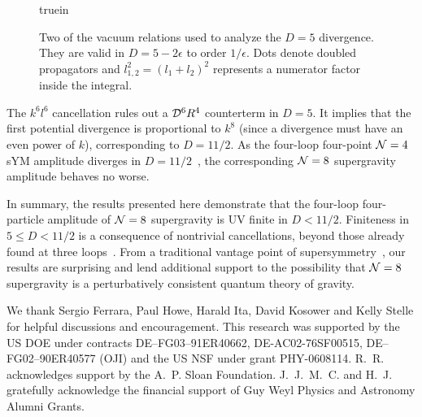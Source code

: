 \documentclass[aps,prl,twocolumn,groupedaddress,draft,showpacs,nofootinbib]{revtex4}
\def\eps{\epsilon}
\def\NeqFour{{{\cal N}=4}}
\def\NeqEight{{{\cal N}=8}}
\begin{document}
\begin{figure}[t]
\centerline{ truein }
\caption[a]{\small Two of the vacuum relations used to analyze
the $D=5$ divergence.  They are valid in $D=5-2\eps$ to order $1/\eps$.
Dots denote doubled propagators and $l^2_{1,2}=(l_1+l_2)^2$ 
represents a numerator factor inside the integral.}
\label{VacuumRelationsFigure}
\end{figure}

The $k^6 l^6$ cancellation rules out a ${\cal D}^6R^4$ counterterm
in $D=5$.  It implies that the first potential divergence
is proportional to $k^8$ (since a divergence must have an
even power of $k$), corresponding to $D=11/2$.  As the four-loop
four-point $\NeqFour$ sYM amplitude diverges in
$D=11/2$~\cite{FourLoopPlanarYM,FourLoopYM}, the corresponding
$\NeqEight$ supergravity amplitude behaves no worse.

In summary, the results presented here demonstrate that the four-loop
four-particle amplitude of $\NeqEight$ supergravity is UV finite
in $D < 11/2$.  Finiteness in $5\le D<11/2$ is a consequence of
nontrivial cancellations, beyond those already found at three
loops~\cite{GravityThree,CompactThree}. 
From a traditional vantage point of
supersymmetry~\cite{Supergravity,HoweStelleNew,HoweStelleRecent}, our
results are surprising and lend additional support to the possibility
that $\NeqEight$ supergravity is a perturbatively consistent quantum
theory of gravity. 

We thank Sergio Ferrara, Paul Howe, Harald Ita, David Kosower and
Kelly Stelle for helpful discussions and encouragement.  This research
was supported by the US DOE under contracts DE--FG03--91ER40662,
DE-AC02-76SF00515, DE--FG02--90ER40577 (OJI) and the US NSF under
grant PHY-0608114.  R.~R.  acknowledges support by the A.~P. Sloan
Foundation.  J.~J.~M.~C. and H.~J. gratefully acknowledge the
financial support of Guy Weyl Physics and Astronomy Alumni Grants.


\end{document}
